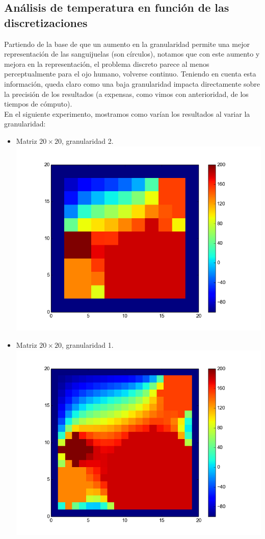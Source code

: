 \subsection{Análisis de temperatura en función de las discretizaciones}
Partiendo de la base de que un aumento en la granularidad permite una mejor representación de las sanguijuelas (son círculos), notamos que con este aumento y mejora en la representación, el problema discreto parece al menos perceptualmente para el ojo humano, volverse continuo. Teniendo en cuenta esta información, queda claro como una baja granularidad impacta directamente sobre la precisión de los resultados (a expensas, como vimos con anterioridad, de los tiempos de cómputo).
\\
En el siguiente experimento, mostramos como varían los resultados al variar la granularidad:
\begin{itemize}
 \item Matriz $20 \times 20$, granularidad 2.\\
  \includegraphics[width=400pt]{imagenes/imagen11.png}

 \item Matriz $20 \times 20$, granularidad 1.\\
  \includegraphics[width=400pt]{imagenes/imagen21.png}


\end{itemize}
